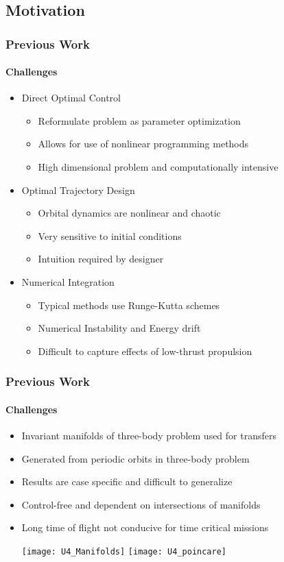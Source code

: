 \section*{}
\subsection*{Motivation}

\begin{frame} %
\frametitle{Previous Work} %
\framesubtitle{Challenges}
\begin{itemize}
	\item Direct Optimal Control
		\begin{itemize}
			\item Reformulate problem as parameter optimization
			\item Allows for use of nonlinear programming methods
			\item High dimensional problem and computationally intensive
		\end{itemize}
	\pause
	\item Optimal Trajectory Design
		\begin{itemize}
			\item Orbital dynamics are nonlinear and chaotic
			\item Very sensitive to initial conditions
			\item Intuition required by designer
		\end{itemize}
	\pause
	\item Numerical Integration
		\begin{itemize}
			\item Typical methods use Runge-Kutta schemes
			\item Numerical Instability and Energy drift
			\item Difficult to capture effects of low-thrust propulsion
		\end{itemize}
	
\end{itemize}
\end{frame}   %

\begin{frame} %
\frametitle{Previous Work}
\framesubtitle{Challenges}
\begin{itemize}
	\item Invariant manifolds of three-body problem used for transfers
	\item Generated from periodic orbits in three-body problem
	\item Results are case specific and difficult to generalize
	\item Control-free and dependent on intersections of manifolds
	\item Long time of flight not conducive for time critical missions
	
	\texttt{[image: U4\_Manifolds]}
	\hfill
	\texttt{[image: U4\_poincare]}
\end{itemize}
\end{frame} %

